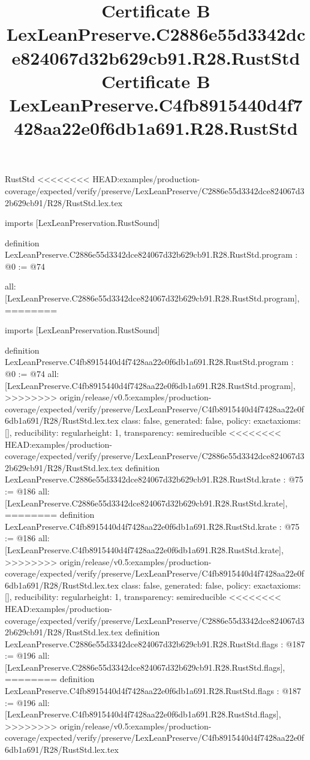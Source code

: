 \begin{lexlean}{RustStd}
<<<<<<<< HEAD:examples/production-coverage/expected/verify/preserve/LexLeanPreserve/C2886e55d3342dce824067d32b629cb91/R28/RustStd.lex.tex
\title{Certificate B LexLeanPreserve.C2886e55d3342dce824067d32b629cb91.R28.RustStd}
\begin{coremodule}
imports [LexLeanPreservation.RustSound]

definition LexLeanPreserve.C2886e55d3342dce824067d32b629cb91.R28.RustStd.program : @0 := @74 {
  all: [LexLeanPreserve.C2886e55d3342dce824067d32b629cb91.R28.RustStd.program],
========
\title{Certificate B LexLeanPreserve.C4fb8915440d4f7428aa22e0f6db1a691.R28.RustStd}
\begin{coremodule}
imports [LexLeanPreservation.RustSound]

definition LexLeanPreserve.C4fb8915440d4f7428aa22e0f6db1a691.R28.RustStd.program : @0 := @74 {
  all: [LexLeanPreserve.C4fb8915440d4f7428aa22e0f6db1a691.R28.RustStd.program],
>>>>>>>> origin/release/v0.5:examples/production-coverage/expected/verify/preserve/LexLeanPreserve/C4fb8915440d4f7428aa22e0f6db1a691/R28/RustStd.lex.tex
  class: false,
  generated: false,
  policy: exact{axioms: []},
  reducibility: regular{height: 1},
  transparency: semireducible
}
<<<<<<<< HEAD:examples/production-coverage/expected/verify/preserve/LexLeanPreserve/C2886e55d3342dce824067d32b629cb91/R28/RustStd.lex.tex
definition LexLeanPreserve.C2886e55d3342dce824067d32b629cb91.R28.RustStd.krate : @75 := @186 {
  all: [LexLeanPreserve.C2886e55d3342dce824067d32b629cb91.R28.RustStd.krate],
========
definition LexLeanPreserve.C4fb8915440d4f7428aa22e0f6db1a691.R28.RustStd.krate : @75 := @186 {
  all: [LexLeanPreserve.C4fb8915440d4f7428aa22e0f6db1a691.R28.RustStd.krate],
>>>>>>>> origin/release/v0.5:examples/production-coverage/expected/verify/preserve/LexLeanPreserve/C4fb8915440d4f7428aa22e0f6db1a691/R28/RustStd.lex.tex
  class: false,
  generated: false,
  policy: exact{axioms: []},
  reducibility: regular{height: 1},
  transparency: semireducible
}
<<<<<<<< HEAD:examples/production-coverage/expected/verify/preserve/LexLeanPreserve/C2886e55d3342dce824067d32b629cb91/R28/RustStd.lex.tex
definition LexLeanPreserve.C2886e55d3342dce824067d32b629cb91.R28.RustStd.flags : @187 := @196 {
  all: [LexLeanPreserve.C2886e55d3342dce824067d32b629cb91.R28.RustStd.flags],
========
definition LexLeanPreserve.C4fb8915440d4f7428aa22e0f6db1a691.R28.RustStd.flags : @187 := @196 {
  all: [LexLeanPreserve.C4fb8915440d4f7428aa22e0f6db1a691.R28.RustStd.flags],
>>>>>>>> origin/release/v0.5:examples/production-coverage/expected/verify/preserve/LexLeanPreserve/C4fb8915440d4f7428aa22e0f6db1a691/R28/RustStd.lex.tex
}}}
\end{coremodule}}
\end{coremodule}
\end{lexlean}
